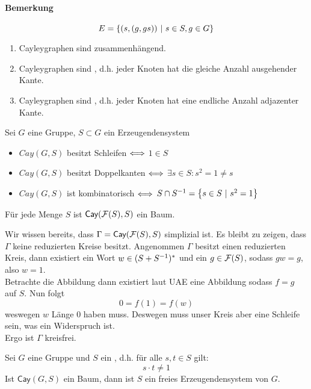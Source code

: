 \documentclass{article}
\newcommand{\tm}{\subset}
\newcommand{\Cay}[2]{\textsf{Cay}(#1,#2)}
\begin{document}
\paragraph{Bemerkung}
\[E = \set{(s, (g, gs))}{ s\in S, g\in G } \]


\begin{enumerate}
\item Cayleygraphen sind zusammenhängend.
\item Cayleygraphen sind , d.h. jeder Knoten hat die gleiche Anzahl ausgehender Kante.
\item Cayleygraphen sind , d.h. jeder Knoten hat eine endliche Anzahl adjazenter Kante.
\end{enumerate}

\Satz{}
Sei $G$ eine Gruppe, $S \tm G$ ein Erzeugendensystem
\begin{itemize}
\item $Cay(G,S)$ besitzt Schleifen $\overset{}{\Longleftrightarrow}$ $1 \in S$
\item $Cay(G,S)$ besitzt Doppelkanten $\overset{}{\Longleftrightarrow}$ $\exists s \in S: s^2 = 1 \neq s$
\item $Cay(G,S)$ ist kombinatorisch $\overset{}{\Longleftrightarrow}$ $S\cap S\i = \set{s\in S}{s^2 = 1}$
\end{itemize}

\Satz{}
Für jede Menge $S$ ist $\Cay{\F(S)}{S}$ ein Baum.

\begin{Beweis}{}
Wir wissen bereits, dass $\Gamma = \Cay{\F(S)}{S}$ simplizial ist. Es bleibt zu zeigen, dass $\Gamma$ keine reduzierten Kreise besitzt. Angenommen $\Gamma$ besitzt einen reduzierten Kreis, dann existiert ein Wort $w \in (S + S^{-1})^*$ und ein $g \in \mathcal{F}(S)$, sodass $gw = g$, also $w = 1$.\\
Betrachte die Abbildung
dann existiert laut UAE eine Abbildung
sodass $f = g$ auf $S$. Nun folgt
\[ 0 = f(1) = f(w) \]
weswegen $w$ Länge 0 haben muss. Deswegen muss unser Kreis aber eine Schleife sein, was ein Widerspruch ist.\\
Ergo ist $\Gamma$ kreisfrei.
\end{Beweis}

Sei $G$ eine Gruppe und $S$ ein , d.h. für alle $s,t \in S$ gilt:
\[ s\cdot t \neq 1 \]
Ist $\Cay{G}{S}$ ein Baum, dann ist $S$ ein freies Erzeugendensystem von $G$.
\end{document}

